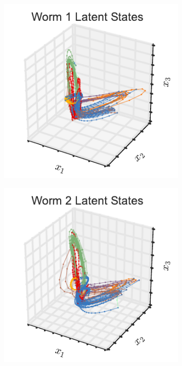 \documentclass{article}
\begin{document}
\begin{figure}[t]
  \centering%
  \begin{subfigure}[b]{0.32\linewidth}
    \includegraphics[width=\textwidth]{xs_3d_worm0.pdf}
  \end{subfigure}
  \begin{subfigure}[b]{0.32\linewidth}
    \includegraphics[width=\textwidth]{xs_3d_worm1.pdf}

\end{subfigure}
\end{figure}
\end{document}
